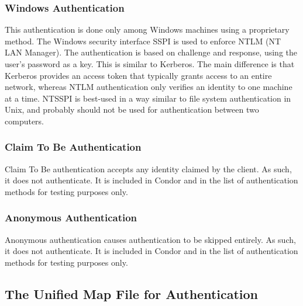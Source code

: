 \subsubsection{\label{sec:NTSSPI-Authentication}Windows Authentication}
This authentication is done only among Windows machines using
a proprietary method.
The Windows security interface SSPI is used to enforce NTLM
(NT LAN Manager).
The authentication is based on challenge and response, using the user's
password as a key.
This is similar to Kerberos.
The main difference 
is that Kerberos provides an access token that typically grants
access to an entire network, whereas NTLM authentication only 
verifies an identity to one machine at a time.
NTSSPI is best-used in a way similar to file system authentication in
Unix, and probably should not be used for authentication between two
computers. 

\subsubsection{\label{sec:CLAIM-Authentication}Claim To Be Authentication}
Claim To Be authentication accepts any identity claimed by the client.
As such, it does not authenticate.
It is included in Condor and in the list of authentication methods
for testing purposes only.

\subsubsection{\label{sec:ANON-Authentication}Anonymous Authentication}
Anonymous authentication causes authentication to be skipped entirely.
As such, it does not authenticate.
It is included in Condor and in the list of authentication methods
for testing purposes only.


\subsection{\label{sec:Security-Unified-Map-File}The Unified Map File for Authentication}


